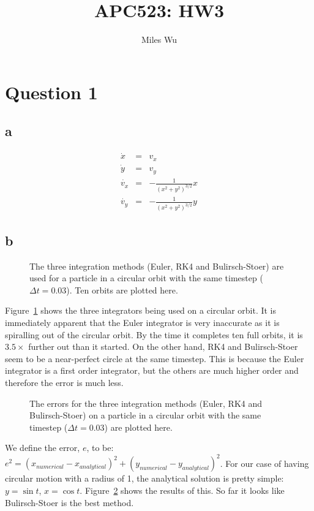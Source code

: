 \documentclass[11pt]{article}
\begin{document}
\title{APC523: HW3}
\author{Miles Wu}
\maketitle

\section{Question 1}
\subsection{a}
\begin{eqnarray}
\dot{x} &=& v_x \\
\dot{y} &=& v_y \\
\dot{v_x} &=& - \frac{1}{(x^2 + y^2)^{3/2}} x \\
\dot{v_y} &=& - \frac{1}{(x^2 + y^2)^{3/2}} y
\end{eqnarray}

\subsection{b}
\begin{figure}
  \centering
\resizebox{0.6\textwidth}{!}{}
  \caption{The three integration methods (Euler, RK4 and Bulirsch-Stoer) are used for a particle in a circular orbit with the same timestep ($\Delta t = 0.03$). Ten orbits are plotted here.}
  \label{q1b-plot}
\end{figure}
Figure~\ref{q1b-plot} shows the three integrators being used on a circular orbit. It is immediately apparent that the Euler integrator is very inaccurate as it is spiralling out of the circular orbit. By the time it completes ten full orbits, it is $3.5\times$ further out than it started. On the other hand, RK4 and Bulirsch-Stoer seem to be a near-perfect circle at the same timestep. This is because the Euler integrator is a first order integrator, but the others are much higher order and therefore the error is much less.

\begin{figure}
  \centering
\resizebox{0.6\textwidth}{!}{}
  \caption{The errors for the three integration methods (Euler, RK4 and Bulirsch-Stoer) on a particle in a circular orbit with the same timestep ($\Delta t = 0.03$) are plotted here.}
  \label{q1b-error}
\end{figure}
We define the error, $e$, to be: $e^2 = (x_{numerical} - x_{analytical})^2 + (y_{numerical} - y_{analytical})^2$. For our case of having circular motion with a radius of 1, the analytical solution is pretty simple: $y = \sin t$, $x = \cos t$. Figure~\ref{q1b-error} shows the results of this. So far it looks like Bulirsch-Stoer is the best method.
\end{document}
